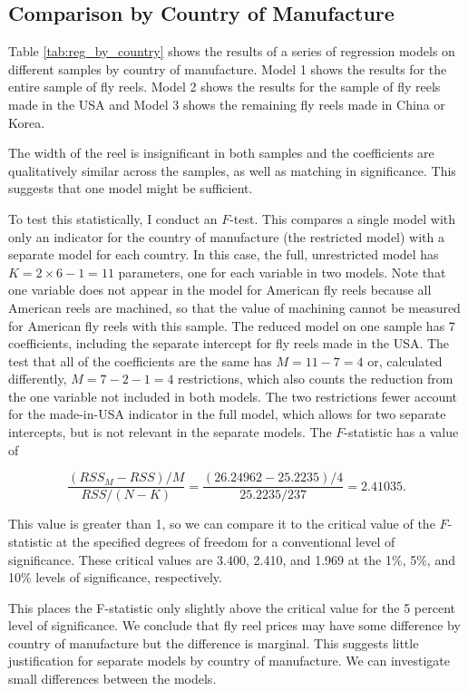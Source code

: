 \documentclass[11pt]{paper}
\begin{document}
\pagebreak
\subsection{Comparison by Country of Manufacture}

Table \ref{tab:reg_by_country} shows the results of 
a series of regression models 
on different samples by country of manufacture.
Model 1 shows the results for the entire sample of fly reels. 
Model 2 shows the results for the sample of fly reels made in the USA
and Model 3 shows the remaining fly reels made in China or Korea.



The width of the reel is insignificant in both samples
and the coefficients are qualitatively similar across the samples, as well as matching in significance. 
This suggests that one model might be sufficient. 




To test this statistically, I conduct an $F$-test. 
This compares a single model with only an
indicator for the country of manufacture
(the restricted model)
with a separate model for each country.
In this case, the full, unrestricted model has 
$K = 2\times6 - 1 = 11$ parameters, one for each variable in two models. 
Note that one variable does not appear in the model for American fly reels because all American reels are machined, 
so that the value of machining cannot be measured for American fly reels with this sample.
The reduced model on one sample has 7 coefficients, 
including the separate intercept for fly reels made in the USA.
The test that all of the coefficients are the same has 
$M = 11 - 7 = 4$
or, calculated differently,
$M = 7 - 2 - 1 = 4$
restrictions, which also counts the reduction from the one variable not included in both models. 
The two restrictions fewer account for the made-in-USA indicator
in the full model, 
which allows for two separate intercepts, 
but is not relevant in the separate models. 
% 
The $F$-statistic has a value of 

$$ 
\frac{(RSS_M - RSS)/M}{RSS/(N - K)} = \frac{(26.24962 - 25.2235)/4}{25.2235/237} = 2.41035. 
$$

This value is greater than 1, so we can compare it to the critical value
of the $F$-statistic at the specified degrees of freedom for
a conventional level of significance.
These critical values are 
3.400, 2.410, and 1.969
at the 1\%, 5\%, and 10\%
levels of significance, respectively.

This places the F-statistic only slightly above the critical value for the
5 percent level of significance.
We conclude that fly reel prices may have some difference by
country of manufacture but the difference is marginal.
This suggests little justification for separate models by
country of manufacture.
We can investigate small differences between the models.
\end{document}
